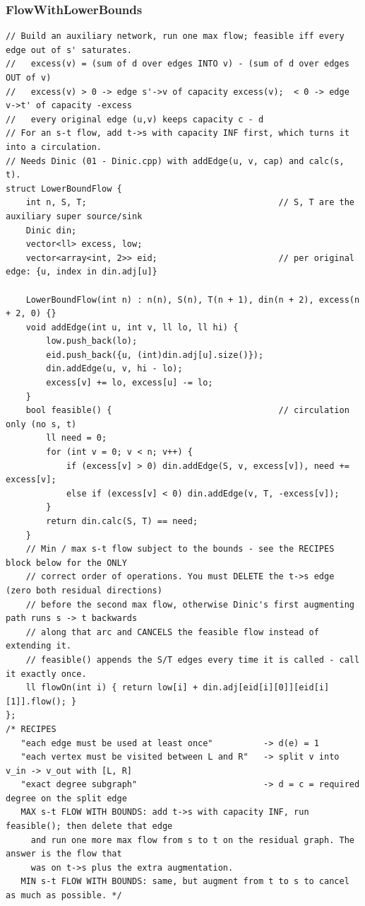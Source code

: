 \documentclass[9pt,a4paper,twocolumn]{extarticle}
\begin{document}
\filbreak
\subsubsection{FlowWithLowerBounds}
\nopagebreak
\begin{lstlisting}
// Build an auxiliary network, run one max flow; feasible iff every edge out of s' saturates.
//   excess(v) = (sum of d over edges INTO v) - (sum of d over edges OUT of v)
//   excess(v) > 0 -> edge s'->v of capacity excess(v);  < 0 -> edge v->t' of capacity -excess
//   every original edge (u,v) keeps capacity c - d
// For an s-t flow, add t->s with capacity INF first, which turns it into a circulation.
// Needs Dinic (01 - Dinic.cpp) with addEdge(u, v, cap) and calc(s, t).
struct LowerBoundFlow {
    int n, S, T;                                      // S, T are the auxiliary super source/sink
    Dinic din;
    vector<ll> excess, low;
    vector<array<int, 2>> eid;                        // per original edge: {u, index in din.adj[u]}

    LowerBoundFlow(int n) : n(n), S(n), T(n + 1), din(n + 2), excess(n + 2, 0) {}
    void addEdge(int u, int v, ll lo, ll hi) {
        low.push_back(lo);
        eid.push_back({u, (int)din.adj[u].size()});
        din.addEdge(u, v, hi - lo);
        excess[v] += lo, excess[u] -= lo;
    }
    bool feasible() {                                 // circulation only (no s, t)
        ll need = 0;
        for (int v = 0; v < n; v++) {
            if (excess[v] > 0) din.addEdge(S, v, excess[v]), need += excess[v];
            else if (excess[v] < 0) din.addEdge(v, T, -excess[v]);
        }
        return din.calc(S, T) == need;
    }
    // Min / max s-t flow subject to the bounds - see the RECIPES block below for the ONLY
    // correct order of operations. You must DELETE the t->s edge (zero both residual directions)
    // before the second max flow, otherwise Dinic's first augmenting path runs s -> t backwards
    // along that arc and CANCELS the feasible flow instead of extending it.
    // feasible() appends the S/T edges every time it is called - call it exactly once.
    ll flowOn(int i) { return low[i] + din.adj[eid[i][0]][eid[i][1]].flow(); }
};
/* RECIPES
   "each edge must be used at least once"          -> d(e) = 1
   "each vertex must be visited between L and R"   -> split v into v_in -> v_out with [L, R]
   "exact degree subgraph"                         -> d = c = required degree on the split edge
   MAX s-t FLOW WITH BOUNDS: add t->s with capacity INF, run feasible(); then delete that edge
     and run one more max flow from s to t on the residual graph. The answer is the flow that
     was on t->s plus the extra augmentation.
   MIN s-t FLOW WITH BOUNDS: same, but augment from t to s to cancel as much as possible. */
\end{lstlisting}
\end{document}
